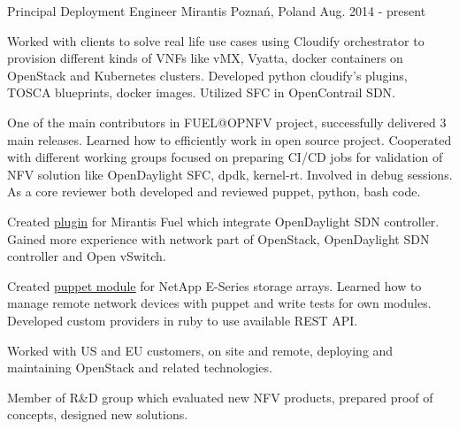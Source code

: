 
\begin{cventries}

  \cventry
    {Principal Deployment Engineer} %
    {Mirantis} %
    {Poznań, Poland} %
    {Aug. 2014 - present} %
    {
      \begin{cvitems} %
        \item {Worked with clients to solve real life use cases using Cloudify orchestrator to provision different
               kinds of VNFs like vMX, Vyatta, docker containers on OpenStack and Kubernetes clusters.
               Developed python cloudify's plugins, TOSCA blueprints, docker images. Utilized SFC in OpenContrail SDN.}
        \item {One of the main contributors in FUEL@OPNFV project, successfully delivered 3 main releases.
               Learned how to efficiently work in open source project. Cooperated with different working groups
               focused on preparing CI/CD jobs for validation of NFV solution like OpenDaylight SFC, dpdk, kernel-rt.
               Involved in debug sessions. As a core reviewer both developed and reviewed puppet, python, bash code.}
        \item {Created \underline{\href{https://github.com/openstack/fuel-plugin-opendaylight}{plugin}}
               for Mirantis Fuel which integrate OpenDaylight SDN controller. Gained more experience with network part
               of OpenStack, OpenDaylight SDN controller and Open vSwitch.}
        \item {Created \underline{\href{https://github.com/NetApp/puppet-eseries/graphs/contributors}{puppet module}}
               for NetApp E-Series storage arrays. Learned how to manage remote network devices with puppet
               and write tests for own modules. Developed custom providers in ruby to use available REST API.}
        \item {Worked with US and EU customers, on site and remote, deploying and maintaining OpenStack and related technologies.}
        \item {Member of R\&D group which evaluated new NFV products, prepared proof of concepts, designed new solutions.}
      \end{cvitems}
    }


\end{cventries}
